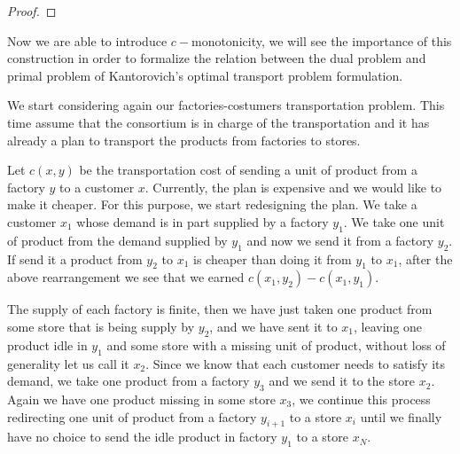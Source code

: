 \begin{proof}

\end{proof}
Now we are able to introduce $c-$monotonicity, we will see the importance of this construction in order to formalize the relation between the dual problem and primal problem of Kantorovich's optimal transport problem formulation. 

We start considering again our factories-costumers transportation problem. This time assume that the consortium is in charge of the transportation and it has already a plan to transport the products from factories to stores. 

Let $c(x,y)$ be the transportation cost of sending a unit of product from a factory $y$ to a customer $x$. Currently, the plan is expensive and we would like to make it cheaper.  For this purpose, we start redesigning the plan. We take a customer $x_1$ whose demand is in part supplied by a factory $y_1$. We take one unit of product from the demand supplied by $y_1$ and now we send it from a factory $y_2$. If send it a product from $y_2$ to $x_1$ is cheaper than doing it from $y_1$ to $x_1$, after the above rearrangement we see that we earned $c(x_1, y_2)-c(x_1,y_1)$. 

The supply of each factory is finite, then we have just taken one product from some store that is being supply by $y_2$, and we have sent it to $x_1$, leaving one product idle in $y_1$ and some store with a missing unit of product, without loss of generality let us call it $x_2$. Since we know that each customer needs to satisfy its demand, we take one product from a factory $y_3$ and we send it to the store $x_2$. Again we have one product missing in some store $x_3$, we continue this process redirecting one unit of product from a factory $y_{i+1}$ to a store $x_{i}$ until we finally have no choice to send the idle product in factory $y_1$ to a store $x_N$. 

